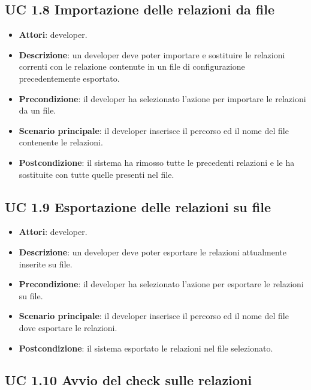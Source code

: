 	\subsection{UC 1.8 Importazione delle relazioni da file}
		\label{subsec:XEUC1.8}
		
		\begin{itemize}
			\item\textbf{Attori}: developer.
			\item\textbf{Descrizione}: un developer deve poter importare e sostituire le relazioni correnti con le relazione contenute in un file di configurazione precedentemente esportato.
			\item\textbf{Precondizione}: il developer ha selezionato l'azione per importare le relazioni da un file.
			\item\textbf{Scenario principale}: il developer inserisce il percorso ed il nome del file contenente le relazioni.
			\item\textbf{Postcondizione}: il sistema ha rimosso tutte le precedenti relazioni e le ha sostituite con tutte quelle presenti nel file.
		\end{itemize}
		
	\subsection{UC 1.9 Esportazione delle relazioni su file}
		\label{subsec:XEUC1.9}
		
		\begin{itemize}
			\item\textbf{Attori}: developer.
			\item\textbf{Descrizione}: un developer deve poter esportare le relazioni attualmente inserite su file.
			\item\textbf{Precondizione}: il developer ha selezionato l'azione per esportare le relazioni su file.
			\item\textbf{Scenario principale}: il developer inserisce il percorso ed il nome del file dove esportare le relazioni.
			\item\textbf{Postcondizione}: il sistema esportato le relazioni nel file selezionato.
		\end{itemize}
		
	\subsection{UC 1.10 Avvio del check sulle relazioni}
		\label{subsec:XEUC1.10}
		
